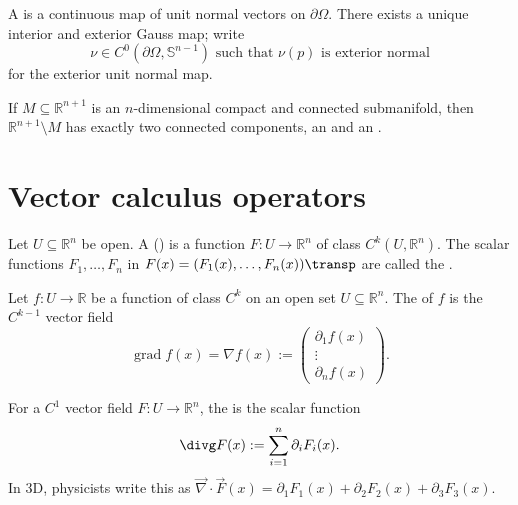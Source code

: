 A  is a continuous map of unit normal vectors on $\partial\Omega$. There
exists a unique interior and exterior Gauss map; write
\[\nu \in C^0(\partial\Omega, \mathbb{S}^{n-1}) \text{ such that } \nu(p) \text{ is exterior
  normal}\]
for the exterior unit normal map.

\begin{theorem}
\label{thm:jordan_brouwer}
If $M \subseteq \mathbb{R}^{n+1}$ is an $n$-dimensional compact and connected submanifold,
then $\mathbb{R}^{n+1}\setminus M$ has exactly two connected components, an
 and an .
\end{theorem}

\section{Vector calculus operators}
\label{sec:vector_calculus_operators}

\begin{definition}
\label{def:vector_field}
Let $U \subseteq \mathbb{R}^n$ be open. A  () is a function $F : U \to \mathbb{R}^n$ of class $C^k(U,\mathbb{R}^n)$.
The scalar functions $F_1, \dots, F_n$ in $F(x) = (F_1(x), \dots, F_n(x))\transp$ are called the .
\end{definition}

\begin{definition}[Gradient]
\label{def:gradient_vector_field}
Let $f : U \to \mathbb{R}$ be a function of class $C^k$ on an open set $U \subseteq \mathbb{R}^n$. The  of $f$ is the $C^{k-1}$ vector field
\[\operatorname{grad} f(x) = \nabla f(x) := \begin{pmatrix} \partial_1 f(x) \\ \vdots \\ \partial_n f(x) \end{pmatrix}.\]
\end{definition}

\begin{definition}[Divergence]
\label{def:divergence}
For a $C^1$ vector field $F : U \to \mathbb{R}^n$, the  is the scalar function
\[\divg F(x) := \sum_{i=1}^n \partial_i F_i(x).\]
In 3D, physicists write this as $\vec{\nabla} \cdot \vec{F}(x) = \partial_1 F_1(x) + \partial_2 F_2(x) + \partial_3 F_3(x)$.
\end{definition}


